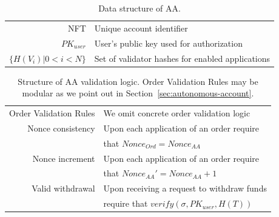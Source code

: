 \documentclass[11pt]{article}
\begin{document}
\begin{sloppypar}
        \begin{table}[h!]
            \begin{center}
                \begin{tabular}{ | r l | }
                    \hline
                    NFT                      & Unique account identifier                        \\
                    $PK_{user}$              & User's public key used for authorization         \\
                    $\{H(V_i) | 0 < i < N\}$ & Set of validator hashes for enabled applications \\
                    \hline
                \end{tabular}
            \end{center}
            \caption{Data structure of AA.}
            \label{tab:table3}
        \end{table}

        \begin{table}[h!]
            \begin{center}
                \begin{tabular}{ | r l | }
                    \hline
                    Order Validation Rules & We omit concrete order validation logic        \\
                    Nonce consistency      & Upon each application of an order require      \\
                    \space                 & that $Nonce_{Ord} = Nonce_{AA}$                \\
                    Nonce increment        & Upon each application of an order require      \\
                    \space                 & that $Nonce_{AA}' = Nonce_{AA} + 1$            \\
                    Valid withdrawal       & Upon receiving a request to withdraw funds     \\
                    \space                 & require that $verify(\sigma, PK_{user}, H(T))$ \\
                    \hline
                \end{tabular}
            \end{center}
            \caption{Structure of AA validation logic. Order Validation Rules may be modular as we point out in Section~\ref{sec:autonomous-account}.}
            \label{tab:table2}
        \end{table}


\end{sloppypar}
\end{document}
